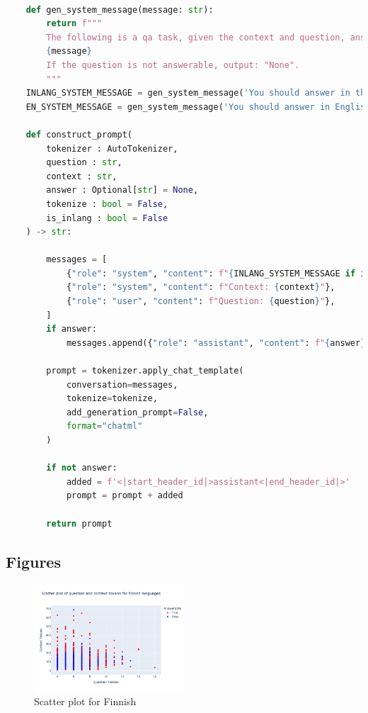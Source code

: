 \documentclass[11pt]{article}
\begin{document}
\begin{lstlisting}[language=Python]

    def gen_system_message(message: str):
        return f"""
        The following is a qa task, given the context and question, answer the question.The answer will be in the context.
        {message}
        If the question is not answerable, output: "None".
        """
    INLANG_SYSTEM_MESSAGE = gen_system_message('You should answer in the same language as the question.')
    EN_SYSTEM_MESSAGE = gen_system_message('You should answer in English.')
    
    def construct_prompt(
        tokenizer : AutoTokenizer,
        question : str,
        context : str,
        answer : Optional[str] = None,
        tokenize : bool = False,
        is_inlang : bool = False
    ) -> str:
        
        messages = [
            {"role": "system", "content": f"{INLANG_SYSTEM_MESSAGE if is_inlang else EN_SYSTEM_MESSAGE}"},
            {"role": "system", "content": f"Context: {context}"},
            {"role": "user", "content": f"Question: {question}"},
        ]
        if answer:
            messages.append({"role": "assistant", "content": f"{answer}"})
    
        prompt = tokenizer.apply_chat_template(
            conversation=messages, 
            tokenize=tokenize, 
            add_generation_prompt=False, 
            format="chatml"
        )
        
        if not answer:
            added = f'<|start_header_id|>assistant<|end_header_id|>'
            prompt = prompt + added
            
        return prompt
\end{lstlisting}

\subsection{Figures}
\label{sec:fig}
\begin{figure}[ht]
    \centering
    \includegraphics[width=0.5\textwidth]{week1_c_scatter_fi.png}
    \caption{Scatter plot for Finnish}
    \label{fig:scatter_week1_c_fi}
\end{figure}
\end{document}
